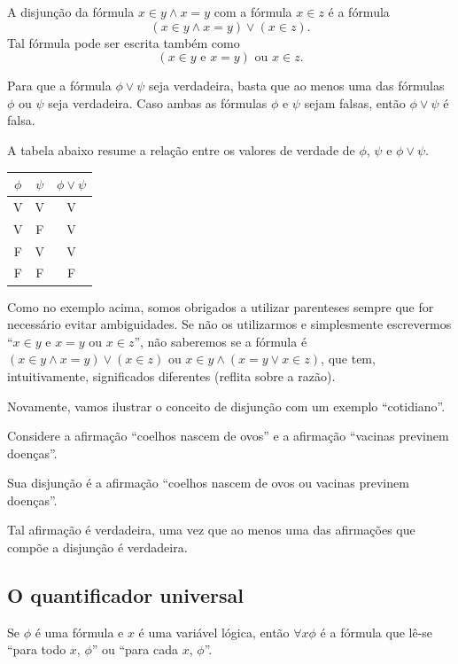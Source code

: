 \begin{example}
    A disjunção da fórmula $x\in y\wedge x=y$ com a fórmula $x\in z$ é a fórmula
    \[
        \left(x\in y\wedge x=y\right) \vee (x\in z).
    \]
    Tal fórmula pode ser escrita também como
    \[
        (x\in y \text{ e } x=y) \text{ ou } x\in z.
    \]
\end{example}

Para que a fórmula $\phi\vee \psi$ seja verdadeira, basta que ao menos uma das fórmulas $\phi$ ou $\psi$ seja verdadeira.
Caso ambas as fórmulas $\phi$ e $\psi$ sejam falsas, então $\phi\vee \psi$ é falsa.

A tabela abaixo resume a relação entre os valores de verdade de $\phi$, $\psi$ e $\phi\vee \psi$.

\begin{center}
    \begin{tabular}{cc|c}
        $\phi$ & $\psi$ & $\phi\vee \psi$ \\
        \hline
        V & V & V \\
        V & F & V \\
        F & V & V \\
        F & F & F
    \end{tabular}
\end{center}

Como no exemplo acima, somos obrigados a utilizar parenteses sempre que for necessário evitar ambiguidades.
Se não os utilizarmos e simplesmente escrevermos ``$x\in y\text{ e } x=y \text{ ou } x\in z$'', não saberemos se a fórmula é $\left(x\in y\wedge x=y\right) \vee (x\in z)$ ou $x\in y\wedge \left(x=y \vee x\in z\right)$, que tem, intuitivamente, significados diferentes (reflita sobre a razão).

Novamente, vamos ilustrar o conceito de disjunção com um exemplo ``cotidiano''.

\begin{example}
    Considere a afirmação ``coelhos nascem de ovos'' e a afirmação ``vacinas previnem doenças''.

    Sua disjunção é a afirmação ``coelhos nascem de ovos ou vacinas previnem doenças''.

    Tal afirmação é verdadeira, uma vez que ao menos uma das afirmações que compõe a disjunção é verdadeira.
\end{example}

\subsection{O quantificador universal}
Se $\phi$ é uma fórmula e $x$ é uma variável lógica, então $\forall x \phi$ é a fórmula que lê-se ``para todo $x$, $\phi$'' ou ``para cada $x$, $\phi$''.

